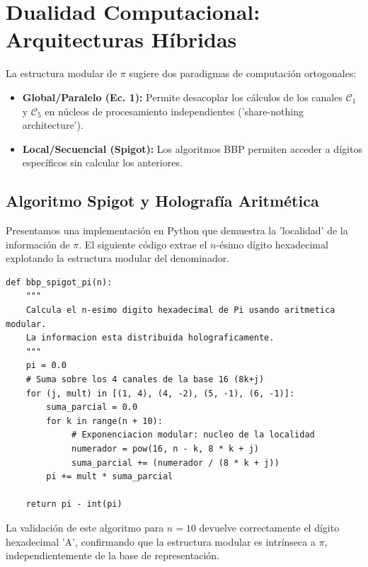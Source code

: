 \documentclass{article}
\theoremstyle{plain}
\theoremstyle{definition}
\theoremstyle{remark}
\numberwithin{equation}{section}
\begin{document}
\section{Dualidad Computacional: Arquitecturas Híbridas}

La estructura modular de $\pi$ sugiere dos paradigmas de computación ortogonales:
\begin{itemize}
    \item \textbf{Global/Paralelo (Ec. 1):} Permite desacoplar los cálculos de los canales $\mathcal{C}_1$ y $\mathcal{C}_5$ en núcleos de procesamiento independientes ('share-nothing architecture').
    \item \textbf{Local/Secuencial (Spigot):} Los algoritmos BBP permiten acceder a dígitos específicos sin calcular los anteriores.
\end{itemize}

\subsection{Algoritmo Spigot y Holografía Aritmética}
Presentamos una implementación en Python que demuestra la 'localidad' de la información de $\pi$. El siguiente código extrae el $n$-ésimo dígito hexadecimal explotando la estructura modular del denominador.

\begin{lstlisting}[caption=Algoritmo BBP Spigot para extracción hexadecimal]
def bbp_spigot_pi(n):
    """
    Calcula el n-esimo digito hexadecimal de Pi usando aritmetica modular.
    La informacion esta distribuida holograficamente.
    """
    pi = 0.0
    # Suma sobre los 4 canales de la base 16 (8k+j)
    for (j, mult) in [(1, 4), (4, -2), (5, -1), (6, -1)]:
        suma_parcial = 0.0
        for k in range(n + 10):
             # Exponenciacion modular: nucleo de la localidad
             numerador = pow(16, n - k, 8 * k + j)  
             suma_parcial += (numerador / (8 * k + j))
        pi += mult * suma_parcial
        
    return pi - int(pi)
\end{lstlisting}

La validación de este algoritmo para $n=10$ devuelve correctamente el dígito hexadecimal 'A', confirmando que la estructura modular es intrínseca a $\pi$, independientemente de la base de representación.

\end{document}

